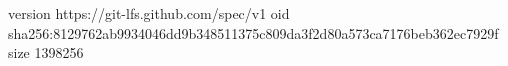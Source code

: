 version https://git-lfs.github.com/spec/v1
oid sha256:8129762ab9934046dd9b348511375c809da3f2d80a573ca7176beb362ec7929f
size 1398256
